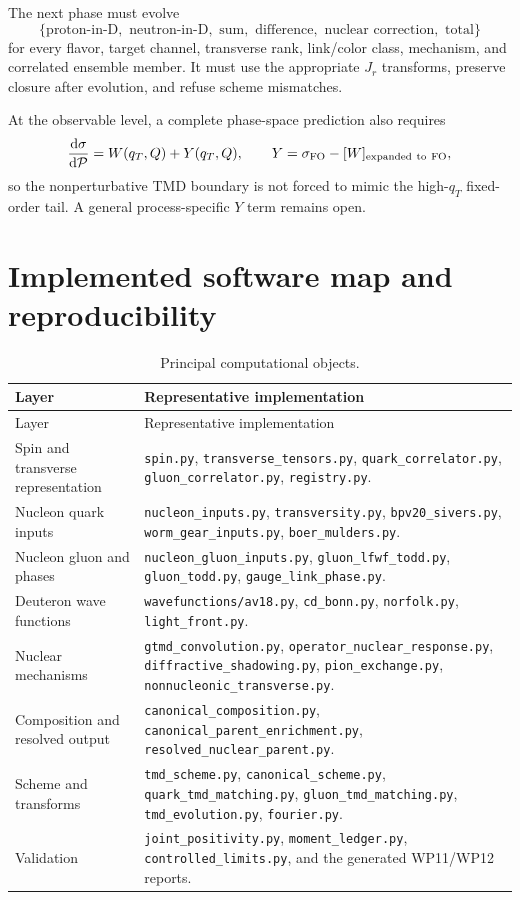 \documentclass[11pt]{article}
\newcommand{\dd}{\mathrm{d}}
\begin{document}
The next phase must evolve
\[
\{\text{proton-in-D},\text{ neutron-in-D},\text{ sum},
\text{ difference},\text{ nuclear correction},\text{ total}\}
\]
for every flavor, target channel, transverse rank, link/color class,
mechanism, and correlated ensemble member.  It must use the appropriate
\(J_r\) transforms, preserve closure after evolution, and refuse scheme
mismatches.

At the observable level, a complete phase-space prediction also requires
\begin{equation}
\frac{\dd\sigma}{\dd\mathcal P}
=W(q_T,Q)+Y(q_T,Q),\qquad
Y=\sigma_{\rm FO}-[W]_{\rm expanded\ to\ FO},
\label{eq:wy}
\end{equation}
so the nonperturbative TMD boundary is not forced to mimic the high-\(q_T\)
fixed-order tail.  A general process-specific \(Y\) term remains open.

\section{Implemented software map and reproducibility}
\label{sec:software}

\begin{longtable}{L{0.25\textwidth}L{0.65\textwidth}}
\caption{Principal computational objects.}
\label{tab:software}\\
\toprule
Layer & Representative implementation \\
\midrule
\endfirsthead
\toprule
Layer & Representative implementation \\
\midrule
\endhead
Spin and transverse representation &
\texttt{spin.py}, \texttt{transverse\_tensors.py},
\texttt{quark\_correlator.py}, \texttt{gluon\_correlator.py},
\texttt{registry.py}.\\
Nucleon quark inputs &
\texttt{nucleon\_inputs.py}, \texttt{transversity.py},
\texttt{bpv20\_sivers.py}, \texttt{worm\_gear\_inputs.py},
\texttt{boer\_mulders.py}.\\
Nucleon gluon and phases &
\texttt{nucleon\_gluon\_inputs.py}, \texttt{gluon\_lfwf\_todd.py},
\texttt{gluon\_todd.py}, \texttt{gauge\_link\_phase.py}.\\
Deuteron wave functions &
\texttt{wavefunctions/av18.py}, \texttt{cd\_bonn.py},
\texttt{norfolk.py}, \texttt{light\_front.py}.\\
Nuclear mechanisms &
\texttt{gtmd\_convolution.py}, \texttt{operator\_nuclear\_response.py},
\texttt{diffractive\_shadowing.py}, \texttt{pion\_exchange.py},
\texttt{nonnucleonic\_transverse.py}.\\
Composition and resolved output &
\texttt{canonical\_composition.py},
\texttt{canonical\_parent\_enrichment.py},
\texttt{resolved\_nuclear\_parent.py}.\\
Scheme and transforms &
\texttt{tmd\_scheme.py}, \texttt{canonical\_scheme.py},
\texttt{quark\_tmd\_matching.py}, \texttt{gluon\_tmd\_matching.py},
\texttt{tmd\_evolution.py}, \texttt{fourier.py}.\\
Validation &
\texttt{joint\_positivity.py}, \texttt{moment\_ledger.py},
\texttt{controlled\_limits.py}, and the generated WP11/WP12 reports.\\
\bottomrule
\end{longtable}
\end{document}
